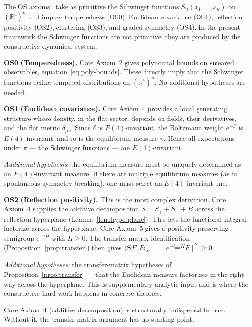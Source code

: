 \documentclass[12pt,a4paper]{article}
\theoremstyle{plain}
\theoremstyle{definition}
\theoremstyle{remark}
\newcommand{\real}{\mathbb{R}}
\begin{document}
The OS axioms~\cite{OS1, OS2} take as primitive the Schwinger
functions $S_n(x_1,\ldots,x_n)$ on $(\real^4)^n$ and impose
temperedness (OS0), Euclidean covariance (OS1), reflection positivity
(OS2), clustering (OS3), and graded symmetry (OS4). In the present
framework the Schwinger functions are not primitive: they are produced
by the constructive dynamical system.

\medskip

\noindent\textbf{OS0 (Temperedness).} Core Axiom~2 gives polynomial
bounds on smeared observables, equation~\eqref{eq:poly-bounds}. These
directly imply that the Schwinger functions define tempered
distributions on $(\real^4)^n$. No additional hypotheses are needed.

\medskip

\noindent\textbf{OS1 (Euclidean covariance).} Core Axiom~4 provides a
local generating structure whose density, in the flat sector, depends
on fields, their derivatives, and the flat metric $\delta_{\mu\nu}$.
Since $\delta$ is $E(4)$-invariant, the Boltzmann weight
$e^{-S}$ is $E(4)$-invariant, and so is the equilibrium measure
$\pi$. Hence all expectations under $\pi$ --- the Schwinger functions
--- are $E(4)$-invariant.

\emph{Additional hypothesis}: the equilibrium measure must be uniquely
determined as an $E(4)$-invariant measure. If there are multiple
equilibrium measures (as in spontaneous symmetry breaking), one must
select an $E(4)$-invariant one.

\medskip

\noindent\textbf{OS2 (Reflection positivity).} This is the most
complex derivation. Core Axiom~4 supplies the additive decomposition
$S = S_+ + S_- + B$ across the reflection hyperplane
(Lemma~\ref{lem:hyperplane}). This lets the functional integral
factorize across the hyperplane. Core Axiom~5 gives a
positivity-preserving semigroup $e^{-tH}$ with $H \ge 0$. The
transfer-matrix identification (Proposition~\ref{prop:transfer}) then
gives $\langle \Theta F, F\rangle_E = \|e^{-t_{\min}H}F\|^2 \ge 0$.

\emph{Additional hypotheses}: the transfer-matrix hypotheses of
Proposition~\ref{prop:transfer} --- that the Euclidean measure
factorizes in the right way across the hyperplane. This is
supplementary analytic input and is where the constructive hard work
happens in concrete theories.

Core Axiom~4 (additive decomposition) is structurally indispensable
here. Without it, the transfer-matrix argument has no starting point.
\end{document}
